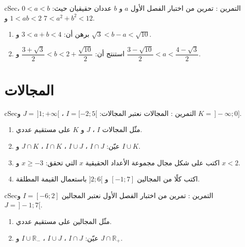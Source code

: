 \documentclass[12pt,a4paper]{article}
\newenvironment{BOX}[2]{\begin{otherlanguage}{english}\begin{arbox}{#1}{#2}}{\end{arbox}\end{otherlanguage}}
\newcounter{exo}
\newenvironment{tamrin}[1]{\stepcounter{exo}\begin{BOX}{cSec}{التمرين \theexo: #1}}{\end{BOX}}
\newcommand{\R}{\mathbb{R}}
\begin{document}
\begin{tamrin}{تمرين من اختبار الفصل الأول}
$a$ و $b$ عددان حقيقيان حيث: $0<a<b$ ، $1<ab<2$ و $7<a^2+b^2<12$.
\begin{enumerate}
\item برهن أن: $3<a+b<4$ و $\sqrt3<b-a<\sqrt{10}$.
\item استنتج أن: $\dfrac{3+\sqrt3}2<b<2+\dfrac{\sqrt{10}}2$ و $\dfrac{3-\sqrt{10}}2<a<\dfrac{4-\sqrt3}2$.
\end{enumerate}
\end{tamrin}

\section{المجالات}
\begin{tamrin}{المجالات}
نعتبر المجالات: $I=[-2;5[$ ، $J=\,]1;+\infty[$ و $K=\,]-\infty;0]$.
\begin{enumerate}
\item مثّل المجالات $I$ ، $J$ و $K$ على مستقيم عددي.
\item عيّن: $I\cap J$ ، $I\cup J$ ، $I\cap K$ ، $J\cap K$ و $I\cup K$.
\item اكتب على شكل مجال مجموعة الأعداد الحقيقية $x$ التي تحقق: $x\geqslant-3$ و $x<2$.
\item اكتب كلًا من المجالين $[-1;7]$ و $]2;6[$ باستعمال القيمة المطلقة.
\end{enumerate}
\end{tamrin}

\begin{tamrin}{تمرين من اختبار الفصل الأول}
نعتبر المجالين $I=[-6;2]$ و $J=\,]-1;7[$.
\begin{enumerate}
\item مثّل المجالين على مستقيم عددي.
\item عيّن: $I\cap J$ ، $I\cup J$ ، $I\cup\R_-$ و $J\cap\R_+$.
\end{enumerate}
\end{tamrin}
\end{document}

